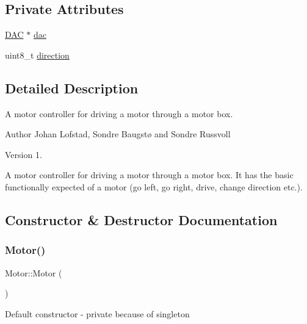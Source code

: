 \subsection*{Private Attributes}
\begin{DoxyCompactItemize}
\item 
\hyperlink{class_d_a_c}{D\+AC} $\ast$ \hyperlink{class_motor_ab8662062a02d2177b7694d5ab6ac6851}{dac}
\item 
uint8\+\_\+t \hyperlink{class_motor_a717a5684a774d01f46c8ae7145158279}{direction}
\end{DoxyCompactItemize}


\subsection{Detailed Description}
A motor controller for driving a motor through a motor box. 

\begin{DoxyAuthor}{Author}
Johan Lofstad, Sondre Baugstø and Sondre Russvoll 
\end{DoxyAuthor}
\begin{DoxyVersion}{Version}
1.
\end{DoxyVersion}
A motor controller for driving a motor through a motor box. It has the basic functionally expected of a motor (go left, go right, drive, change direction etc.). 

\subsection{Constructor \& Destructor Documentation}
\hypertarget{class_motor_af6106b4c506411265c5face762b6c004}{}\label{class_motor_af6106b4c506411265c5face762b6c004} 
\subsubsection{\texorpdfstring{Motor()}{Motor()}\hspace{0.1cm}{\footnotesize\ttfamily [1/2]}}
{\footnotesize\ttfamily Motor\+::\+Motor (\begin{DoxyParamCaption}{ }\end{DoxyParamCaption})\hspace{0.3cm}{\ttfamily [private]}}

Default constructor -\/ private because of singleton \hypertarget{class_motor_a52b11cfa6ffdd07dcb26c71a017142a1}{}\label{class_motor_a52b11cfa6ffdd07dcb26c71a017142a1} 
